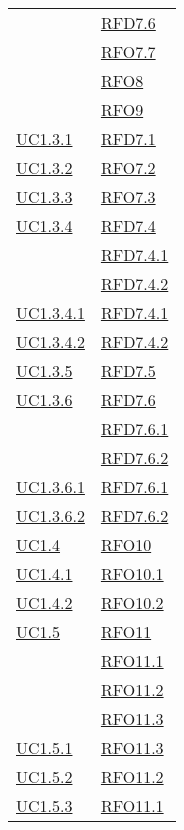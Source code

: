 \begin{longtable}{|>{\centering}m{5cm}|m{5cm}<{\centering}|}
& \hyperlink{RFD7.6}{RFD7.6}\\
& \hyperlink{RFO7.7}{RFO7.7}\\
& \hyperlink{RFO8}{RFO8}\\
& \hyperlink{RFO9}{RFO9}\\ \hline
\hyperref[UC1.3.1]{UC1.3.1} & \hyperlink{RFD7.1}{RFD7.1}\\ \hline
\hyperref[UC1.3.2]{UC1.3.2} & \hyperlink{RFO7.2}{RFO7.2}\\ \hline
\hyperref[UC1.3.3]{UC1.3.3} & \hyperlink{RFO7.3}{RFO7.3}\\ \hline
\hyperref[UC1.3.4]{UC1.3.4} & \hyperlink{RFD7.4}{RFD7.4}\\
& \hyperlink{RFD7.4.1}{RFD7.4.1}\\
& \hyperlink{RFD7.4.2}{RFD7.4.2}\\ \hline
\hyperref[UC1.3.4.1]{UC1.3.4.1} & \hyperlink{RFD7.4.1}{RFD7.4.1}\\ \hline
\hyperref[UC1.3.4.2]{UC1.3.4.2} & \hyperlink{RFD7.4.2}{RFD7.4.2}\\ \hline
\hyperref[UC1.3.5]{UC1.3.5} & \hyperlink{RFD7.5}{RFD7.5}\\ \hline
\hyperref[UC1.3.6]{UC1.3.6} & \hyperlink{RFD7.6}{RFD7.6}\\
& \hyperlink{RFD7.6.1}{RFD7.6.1}\\
& \hyperlink{RFD7.6.2}{RFD7.6.2}\\ \hline
\hyperref[UC1.3.6.1]{UC1.3.6.1} & \hyperlink{RFD7.6.1}{RFD7.6.1}\\ \hline
\hyperref[UC1.3.6.2]{UC1.3.6.2} & \hyperlink{RFD7.6.2}{RFD7.6.2}\\ \hline
\hyperref[UC1.4]{UC1.4} & \hyperlink{RFO10}{RFO10}\\ \hline
\hyperref[UC1.4.1]{UC1.4.1} & \hyperlink{RFO10.1}{RFO10.1}\\ \hline
\hyperref[UC1.4.2]{UC1.4.2} & \hyperlink{RFO10.2}{RFO10.2}\\ \hline
\hyperref[UC1.5]{UC1.5} & \hyperlink{RFO11}{RFO11}\\
& \hyperlink{RFO11.1}{RFO11.1}\\
& \hyperlink{RFO11.2}{RFO11.2}\\
& \hyperlink{RFO11.3}{RFO11.3}\\ \hline
\hyperref[UC1.5.1]{UC1.5.1} & \hyperlink{RFO11.3}{RFO11.3}\\ \hline
\hyperref[UC1.5.2]{UC1.5.2} & \hyperlink{RFO11.2}{RFO11.2}\\ \hline
\hyperref[UC1.5.3]{UC1.5.3} & \hyperlink{RFO11.1}{RFO11.1}\\ \hline

\end{longtable}
